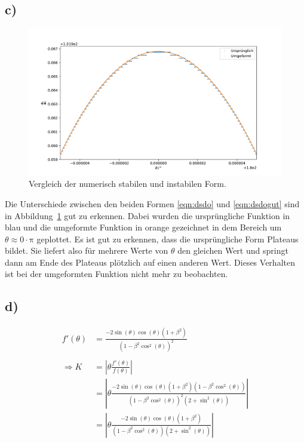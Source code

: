 \documentclass[a4paper, 11pt]{article}
\begin{document}
\subsection*{c)}
\begin{figure}
    \centering
    \includegraphics[width=\textwidth]{../A04/A4_stab.pdf}
    \caption{Vergleich der numerisch stabilen und instabilen Form.}
    \label{fig:4c}
\end{figure}
Die Unterschiede zwischen den beiden Formen \eqref{eqn:dsdo} und \eqref{eqn:dsdogut} sind in Abbildung~\ref{fig:4c} gut zu erkennen.
Dabei wurden die ursprüngliche Funktion in blau und die umgeformte Funktion in orange gezeichnet in dem Bereich um $\theta \approx 0\cdot\mathrm{\pi}$ geplottet.
Es ist gut zu erkennen, dass die ursprüngliche Form Plateaus bildet.
Sie liefert also für mehrere Werte von $\theta$ den gleichen Wert und springt dann am Ende des Plateaus plötzlich auf einen anderen Wert.
Dieses Verhalten ist bei der umgeformten Funktion nicht mehr zu beobachten.
\subsection*{d)}
\begin{equation}
    \begin{split}
        f'\left(\theta\right) &= \frac{-2 \sin\left(\theta\right)\cos\left(\theta\right) \left(1+\beta^2\right)}{\left(1-\beta^2 \cos^2\left(\theta\right)\right)^2} \\
        \\
        \Rightarrow K &= \left| \theta  \frac{f'\left(\theta\right)}{f\left(\theta\right)}\right| \\
        &= \left| \theta  \frac{-2 \sin\left(\theta\right)\cos\left(\theta\right)\left(1+\beta^2\right)\left(1-\beta^2 \cos^2\left(\theta\right)\right)}
        {\left(1-\beta^2 \cos^2\left(\theta\right)\right)^2 \left(2+\sin^2\left(\theta\right)\right)} \right| \\
        &= \left| \theta  \frac{-2 \sin\left(\theta\right)\cos\left(\theta\right)\left(1+\beta^2\right)}{\left(1-\beta^2 \cos^2\left(\theta\right)\right) \left(2+\sin^2\left(\theta\right)\right)}\right|
    \end{split}
    \label{eqn:K}
\end{equation}
\end{document}
